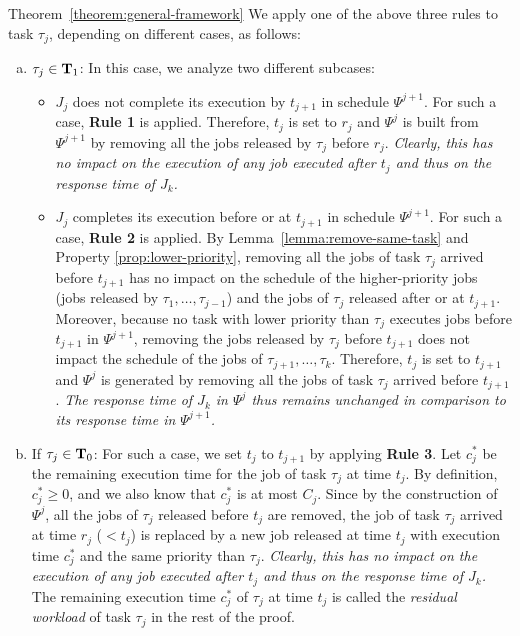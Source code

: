 \begin{appProof}{Theorem~\ref{theorem:general-framework}}
We apply one of the above three rules to task $\tau_j$, depending on different cases, as follows:
\begin{enumerate}[(a)]
\item $\tau_j \in {\bf T}_1$: In this case, we analyze two different subcases:
\begin{itemize}
\item $J_{j}$ does not complete its execution by $t_{j+1}$ in schedule $\Psi^{j+1}$. For such a case, {\bf Rule 1} is applied. Therefore, $t_{j}$ is set to $r_j$ and $\Psi^j$ is built from $\Psi^{j+1}$ by removing all the jobs released by $\tau_j$ before $r_j$.  \emph{Clearly, this has no impact on the execution of any job executed after $t_j$ and thus on the response time of $J_k$.}
\item $J_{j}$ completes its execution before or at $t_{j+1}$ in schedule $\Psi^{j+1}$. For such a case, {\bf Rule 2} is applied.  By Lemma~\ref{lemma:remove-same-task} and Property \ref{prop:lower-priority}, removing all the jobs of task $\tau_j$ arrived before $t_{j+1}$ has no impact on the schedule of the higher-priority jobs (jobs released by $\tau_1, \ldots, \tau_{j-1}$) and the jobs of $\tau_j$ released after or at $t_{j+1}$. 
Moreover, because no task with lower priority than $\tau_j$ executes jobs before $t_{j+1}$ in $\Psi^{j+1}$, removing the jobs released by $\tau_j$ before $t_{j+1}$ does not impact the schedule of the jobs of $\tau_{j+1}, \ldots, \tau_{k}$. Therefore, $t_j$ is set to $t_{j+1}$ and $\Psi^j$ is generated by removing all the jobs of task $\tau_j$ arrived before $t_{j+1}$. \emph{The response time of $J_{k}$ in $\Psi^j$ thus remains unchanged in comparison to its response time in $\Psi^{j+1}$.}
\end{itemize}
\item If $\tau_j \in {\bf T}_0$: For such a case, we set $t_{j}$ to $t_{j+1}$ by applying {\bf Rule 3}. Let $c_j^*$ be the remaining execution time for the job of task $\tau_j$ at time $t_j$. By definition, $c_j^* \geq 0$, and we also know that $c_j^*$ is at most $C_j$. Since by the construction of $\Psi^j$, all the jobs of $\tau_j$ released before $t_j$ are removed, the job of task $\tau_j$ arrived at time $r_j$ ($< t_j$) is replaced by a new job released at time $t_j$ with execution time $c_j^*$ and the same priority than $\tau_j$. \emph{Clearly, this has no impact on the execution of any job executed after $t_j$ and thus on the response time of $J_k$.} The remaining execution time $c_j^*$ of $\tau_j$ at time $t_j$ is called the \emph{residual workload} of task $\tau_j$ in the rest of the proof.
\end{enumerate}


\end{appProof}
